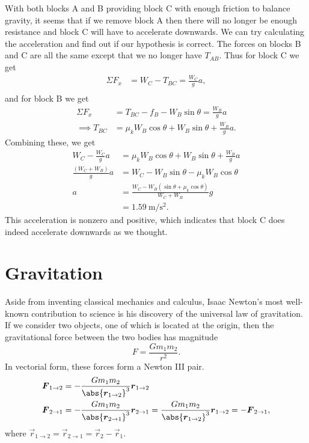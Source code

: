 \documentclass[../classical_mechanics.tex]{subfiles}
\begin{document}
\begin{example}
                With both blocks A and B providing block C with enough friction to balance gravity, it seems that if we remove block A then there will no longer be enough resistance and block C will have to accelerate downwards.
                We can try calculating the acceleration and find out if our hypothesis is correct.
                The forces on blocks B and C are all the same except that we no longer have $T_{AB}$.
                Thus for block C we get
                \begin{align}
                    \Sigma F_x&=W_C-T_{BC}=\frac{W_C}{g}a,\\
                \end{align}
                and for block B we get
                \begin{align}
                    \Sigma F_x&=T_{BC}-f_B-W_B\sin\theta=\frac{W_B}{g}a\\
                    \implies T_{BC}&=\mu_k W_B\cos\theta+W_B\sin\theta+\frac{W_B}{g}a.
                \end{align}
                Combining these, we get
                \begin{align}
                    W_C-\frac{W_C}{g}a&=\mu_k W_B\cos\theta+W_B\sin\theta+\frac{W_B}{g}a\\
                    \frac{(W_C+W_B)}{g}a&=W_C-W_B\sin\theta-\mu_k W_B\cos\theta\\
                    a&=\frac{W_C-W_B(\sin\theta+\mu_k\cos\theta)}{W_C+W_B}g\\
                    &=\qty{1.59}{\metre\per\square\second}.
                \end{align}
                This acceleration is nonzero and positive, which indicates that block C does indeed accelerate downwards as we thought.
            \end{example}

    \section{Gravitation}\label{sec:gravitation}
        Aside from inventing classical mechanics and calculus, Isaac Newton's most well-known contribution to science is his discovery of the universal law of gravitation.
        If we consider two objects, one of which is located at the origin, then the gravitational force between the two bodies has magnitude
        \begin{equation}
            F=\frac{Gm_1m_2}{r^2}.
        \end{equation}
        In vectorial form, these forces form a Newton III pair.
        \begin{align}
            \vec{F}_{1\to2}&=-\frac{Gm_1m_2}{\abs{\vec{r}_{1\to2}}^3}\vec{r}_{1\to2}\\
            \vec{F}_{2\to1}&=-\frac{Gm_1m_2}{\abs{\vec{r}_{2\to1}}^3}\vec{r}_{2\to1}=\frac{Gm_1m_2}{\abs{\vec{r}_{1\to2}}^3}\vec{r}_{1\to2}=-\vec{F}_{2\to1},
        \end{align}
        where $\vec{r}_{1\to2}=\vec{r}_{2\to1}=\vec{r}_2-\vec{r}_1$.
        
\end{document}
